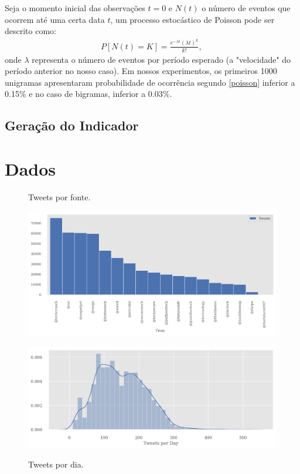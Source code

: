 \documentclass[paper=a4, fontsize=11pt]{scrartcl}
\numberwithin{equation}{section}		%
\numberwithin{figure}{section}			%
\numberwithin{table}{section}				%
\begin{document}
Seja o momento inicial das observações $t=0$ e $N(t)$ o número de eventos que ocorrem até uma certa data $t$, um processo estocástico de Poisson pode ser descrito como:
\begin{align}
	P[N(t)=K]=\frac{e^{-\lambda t} (\lambda t )^k}{k!},\,\! \label{poisson}
\end{align}
onde $\lambda$ representa o número de eventos por período esperado (a "velocidade"  do período anterior no nosso caso).
Em nossos experimentos, os primeiros 1000 unigramas apresentaram probabilidade de ocorrência segundo \ref{poisson} inferior a 0.15\% e no caso de bigramas, inferior a 0.03\%.
\subsection{Geração do Indicador}
\section{Dados}\label{sec:dados}
\begin{figure}[!h]
  \centering
  \begin{minipage}[t]{0.4\textwidth}
		\caption{Tweets por fonte.}
		\includegraphics[width=\textwidth]{from}
		\label{fig:from}
  \end{minipage}
  \hfill
  \begin{minipage}[t]{0.4\textwidth}
		\caption{Tweets por dia.}
		\includegraphics[width=\textwidth]{perDay}
		\label{fig:daily}
  \end{minipage}
\end{figure}
\end{document}
